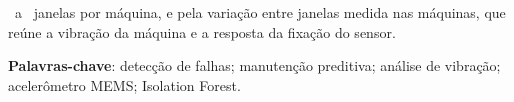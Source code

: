 \begin{resumo}
\campoJanelasGuilhotinaUm\ a \campoJanelasCalandraUm\ janelas por máquina, e pela variação entre janelas medida nas máquinas, que reúne a vibração da máquina e a resposta da fixação do sensor.

\vspace{\onelineskip}
\noindent
\textbf{Palavras-chave}: detecção de falhas; manutenção preditiva; análise de vibração; acelerômetro MEMS; Isolation Forest.
\end{resumo}
